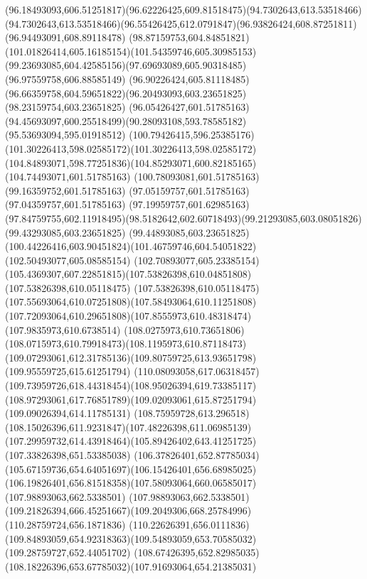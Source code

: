 {{	\curveto(96.18493093,606.51251817)(96.62226425,609.81518475)(94.7302643,613.53518466)
	\curveto(94.7302643,613.53518466)(96.55426425,612.0791847)(96.93826424,608.87251811)
	\lineto(96.94493091,608.89118478)
	\curveto(98.87159753,604.84851821)(101.01826414,605.16185154)(101.54359746,605.30985153)
	\curveto(99.23693085,604.42585156)(97.69693089,605.90318485)(96.97559758,606.88585149)
	\curveto(96.90226424,605.81118485)(96.66359758,604.59651822)(96.20493093,603.23651825)
	\lineto(98.23159754,603.23651825)
	\lineto(96.05426427,601.51785163)
	\curveto(94.45693097,600.25518499)(90.28093108,593.78585182)(95.53693094,595.01918512)
	\curveto(100.79426415,596.25385176)(101.30226413,598.02585172)(101.30226413,598.02585172)
	\curveto(104.84893071,598.77251836)(104.85293071,600.82185165)(104.74493071,601.51785163)
	\lineto(100.78093081,601.51785163)
	\lineto(99.16359752,601.51785163)
	\lineto(97.05159757,601.51785163)
	\lineto(97.04359757,601.51785163)
	\lineto(97.19959757,601.62985163)
	\curveto(97.84759755,602.11918495)(98.5182642,602.60718493)(99.21293085,603.08051826)
	\lineto(99.43293085,603.23651825)
	\lineto(99.44893085,603.23651825)
	\curveto(100.44226416,603.90451824)(101.46759746,604.54051822)(102.50493077,605.08585154)
	\curveto(102.70893077,605.23385154)(105.4369307,607.22851815)(107.53826398,610.04851808)
	\lineto(107.53826398,610.05118475)
	\curveto(107.53826398,610.05118475)(107.55693064,610.07251808)(107.58493064,610.11251808)
	\curveto(107.72093064,610.29651808)(107.8555973,610.48318474)(107.9835973,610.6738514)
	\curveto(108.0275973,610.73651806)(108.0715973,610.79918473)(108.1195973,610.87118473)
	\curveto(109.07293061,612.31785136)(109.80759725,613.93651798)(109.95559725,615.61251794)
	\curveto(110.08093058,617.06318457)(109.73959726,618.44318454)(108.95026394,619.73385117)
	\curveto(108.97293061,617.76851789)(109.02093061,615.87251794)(109.09026394,614.11785131)
	\curveto(108.75959728,613.296518)(108.15026396,611.9231847)(107.48226398,611.06985139)
	\curveto(107.29959732,614.43918464)(105.89426402,643.41251725)(107.33826398,651.53385038)
	\curveto(106.37826401,652.87785034)(105.67159736,654.64051697)(106.15426401,656.68985025)
	\curveto(106.19826401,656.81518358)(107.58093064,660.06585017)(107.98893063,662.5338501)
	\curveto(107.98893063,662.5338501)(109.21826394,666.45251667)(109.2049306,668.25784996)
	\lineto(110.28759724,656.1871836)
	\lineto(110.22626391,656.0111836)
	\curveto(109.84893059,654.92318363)(109.54893059,653.70585032)(109.28759727,652.44051702)
	\curveto(108.67426395,652.82985035)(108.18226396,653.67785032)(107.91693064,654.21385031)
}}
